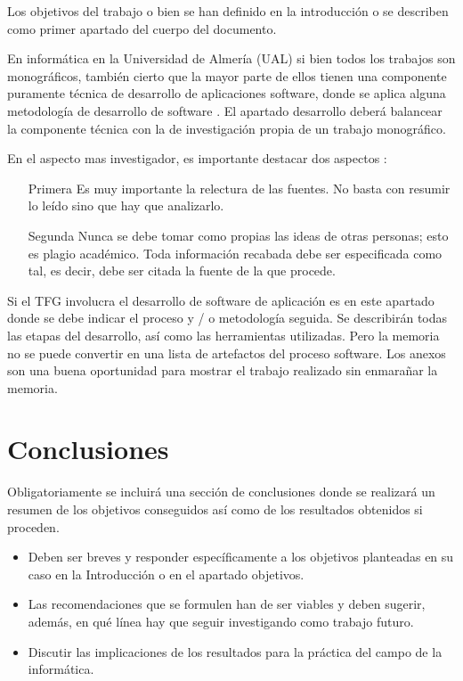 Los objetivos del trabajo o bien se han definido en la introducción o se describen como primer apartado del cuerpo del documento.

En informática en la Universidad de Almería (UAL) si bien todos los trabajos son monográficos, también cierto que la mayor parte de ellos tienen una componente puramente técnica de desarrollo de aplicaciones software, donde se aplica alguna metodología de desarrollo de software \cite{SWEBOK2014}. El apartado desarrollo deberá balancear la componente  técnica con la de investigación propia de un trabajo monográfico.

En el aspecto mas investigador,  es  importante  destacar  dos  aspectos \cite{alicante}:  
\begin{itemize}
    \item [Primera]  Es  muy  importante  la  relectura  de  las  fuentes. No basta con   resumir   lo  leído  sino  que hay que   analizarlo. %
    \item [Segunda]   Nunca  se  debe  tomar  como  propias  las  ideas  de  otras  personas;  esto  es  plagio  académico. Toda  información  recabada    debe  ser  especificada  como  tal,  es  decir,  debe  ser  citada la fuente de la que procede.
    
\end{itemize}


Si el TFG involucra el desarrollo de software de aplicación es en este apartado donde se debe indicar el proceso y / o metodología seguida. Se describirán todas las etapas del desarrollo, así como las herramientas utilizadas. Pero la memoria no se puede convertir en una lista de artefactos del proceso software. Los anexos son una buena oportunidad para mostrar el trabajo realizado sin enmarañar la memoria.



 \section{Conclusiones}
Obligatoriamente se incluirá una sección de conclusiones donde se realizará  un  resumen  de los objetivos  conseguidos  así  como de  los resultados obtenidos si proceden.
\begin{itemize}
\item Deben ser breves y responder específicamente a los objetivos
planteadas en su caso en  la Introducción o en el apartado objetivos.
\item  Las recomendaciones que se formulen han de ser viables y
deben sugerir, además, en qué línea hay que seguir investigando como trabajo futuro.
\item Discutir las implicaciones de los resultados para la práctica  del campo de la informática.

\end{itemize}



